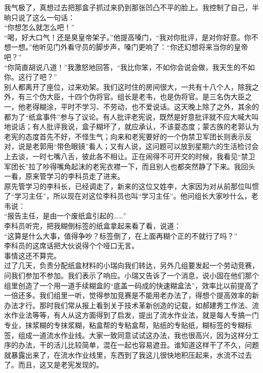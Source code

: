 我气极了，真想过去把那盒子抓过来扔到那张凹凸不平的脸上。我控制了自己，半晌只说了这么一句话：\\

“你想怎么就怎么吧！”\\

“喝，好大口气！还是臭皇帝架子。”他提高嗓门，“我对你批评，是对你好意。你不想一想。”他听见门外看守员的脚步声，嗓门更响了：“你还幻想将来当你的皇帝吧？”\\

“你简直胡说八道！”我激怒地回答，“我比你笨，不如你会说会做，我天生的不如你。这行了吧？”\\

别人都离开了座位，过来劝架。我们这时住的房间很大，一共有十八个人，除我之外，有三个伪大臣，十四个伪将官。组长是老韦，也是伪将官。是三名伪大臣之一，他老得糊涂，平时不学习、不劳动，也不爱说话。这天晚上除了之外，其余的都为了“纸盒事件”参与了议论。有人批评老宪说，既然是好意批评就不应大喊大叫地说话；有人批评我说，盒子糊坏了，就应承认，不该耍态度；蒙古族的老郭认为老宪的态度首先不好，不怪生气；向来和老宪要好的一个伪禁卫军团长则表示反对，说是老郭用“带色眼镜”看人；又有人说，这问题可以放到星期六的生活检讨会上去谈，一时七嘴八舌，彼此各不相让。正在闹得不可开交的时候，我看见“禁卫军团长”拉了吵得嘴角起沫的老宪衣襟一下，而且别人也都突然静了下来。我回头一看，原来管学习的李科员走了进来。\\

原先管学习的李科长，已经调走了，新来的这位又姓李，大家因为对从前那位叫惯了“学习主任”，所以现在对这位李科员也叫“学习主任”。他问组长大家吵什么，老韦说：\\

“报告主任，是由一个废纸盒引起的……”\\

李科员听完，把我糊倒标签的纸盒拿起来看了看，说道：\\

“这算是什么大事，值得争吵？标签倒了，在上面再糊个正的不就行了吗？”\\

李科员的这席话把大伙说得个个哑口无言。\\

事情这还不算完。\\

过了几天，负责分配纸盒材料的小瑞向我们转达，另外几组要发起一个劳动竞赛，问我们参加不参加。我们表示了响应。小瑞又告诉了一个消息，说小固在他们那个组里创造了一个用一道手续糊盒的“底盖一码成的快速糊盒法”，效率比以前提高了一倍还多。我们组里一听，觉得参加竞赛是不能用老办法了，得想个提高效率的新办法才行。那时我们常从报上看到关于技术革新创造的记载，如郝建秀工作法、流水作业法等等，有人从这方面得到了启发，提出了流水作业法，就是每人专搞一门专业，抹浆糊的专抹浆糊，粘盒帮的专粘盒帮，贴纸的专贴纸，糊标签的专糊标签，组成一道流水作业线。大家一致同意试试这办法，我也很高兴，因为这样分工序的办法，干的活儿比较简单，混在一起也容易遮丑。谁知道这样干了不久，问题就暴露出来了，在流水作业线里，东西到了我这儿很快地积压起来，水流不过去了。而且，这又是老宪发现的。\\

